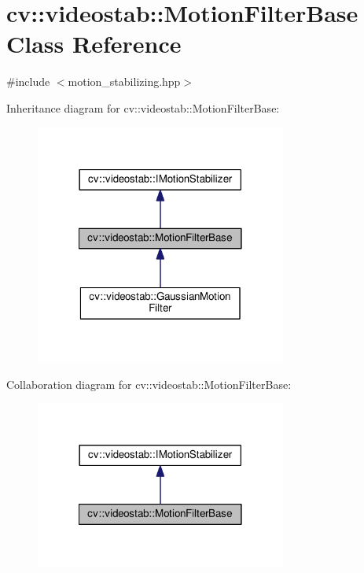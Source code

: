\hypertarget{classcv_1_1videostab_1_1MotionFilterBase}{\section{cv\-:\-:videostab\-:\-:Motion\-Filter\-Base Class Reference}
\label{classcv_1_1videostab_1_1MotionFilterBase}
}


{\ttfamily \#include $<$motion\-\_\-stabilizing.\-hpp$>$}



Inheritance diagram for cv\-:\-:videostab\-:\-:Motion\-Filter\-Base\-:\nopagebreak
\begin{figure}[H]
\begin{center}
\leavevmode
\includegraphics[width=234pt]{classcv_1_1videostab_1_1MotionFilterBase__inherit__graph}
\end{center}
\end{figure}


Collaboration diagram for cv\-:\-:videostab\-:\-:Motion\-Filter\-Base\-:\nopagebreak
\begin{figure}[H]
\begin{center}
\leavevmode
\includegraphics[width=234pt]{classcv_1_1videostab_1_1MotionFilterBase__coll__graph}
\end{center}
\end{figure}
